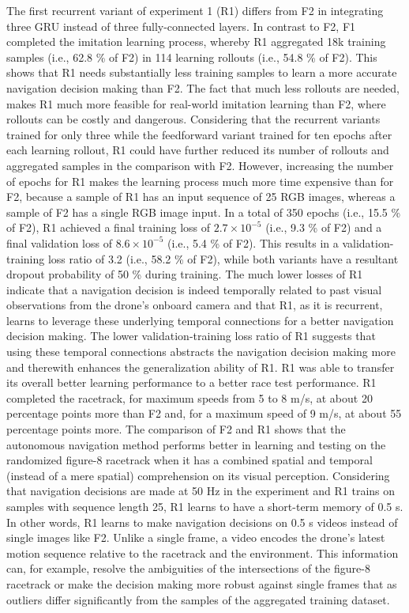 The first recurrent variant of experiment 1 (R1)
differs from F2 in integrating three GRU
instead of three fully-connected layers.
In contrast to F2,
F1 completed the imitation learning process,
whereby R1 aggregated 18k training samples (i.e., 62.8 \% of F2)
in 114 learning rollouts (i.e., 54.8 \% of F2).
This shows that R1 needs substantially less training samples
to learn a more accurate navigation decision making than F2.
The fact that much less rollouts are needed,
makes R1 much more feasible for real-world imitation learning than F2,
where rollouts can be costly and dangerous.
Considering that the recurrent variants trained for only three
while the feedforward variant trained for ten epochs after each learning rollout,
R1 could have further reduced its number of rollouts and aggregated samples
in the comparison with F2.
However, increasing the number of epochs for R1 makes the 
learning process much more time expensive than for F2,
because a sample of R1 
has an input sequence of 25 RGB images,
whereas a sample of F2 has a single RGB image input.
In a total of 350 epochs (i.e., 15.5 \% of F2),
R1 achieved a final training loss of $2.7\times 10^{-5}$ 
(i.e., 9.3 \% of F2)
and a final validation loss of
$8.6\times 10^{-5}$
(i.e., 5.4 \% of F2).
This results in a validation-training loss ratio
of 3.2 (i.e., 58.2 \% of F2),
while both variants have a resultant dropout probability of 50 \% during training.
The much lower losses of R1 indicate
that a navigation decision is indeed temporally related
to past visual observations from the drone's onboard camera
and that R1, as it is recurrent, 
learns to leverage these underlying temporal connections
for a better navigation decision making.
The lower validation-training loss ratio of R1 
suggests that using these temporal connections
abstracts the navigation decision making more and therewith
enhances the generalization ability of R1.
R1 was able to transfer its overall better learning performance to a better race test performance.
R1 completed the racetrack, for maximum speeds from 5 to 8 m/s, at about 20 percentage points more than F2
and, for a maximum speed of 9 m/s, at about 55 percentage points more.
The comparison of F2 and R1
shows that the autonomous navigation method
performs better in learning and testing
on the randomized figure-8 racetrack
when it has a combined spatial and temporal 
(instead of a mere spatial) comprehension on its visual perception.
Considering that navigation decisions are made at 50 Hz in the experiment
and R1 trains on samples with sequence length 25,
R1 learns to have a short-term memory of 0.5 s.
In other words, R1 learns to make navigation decisions on 0.5 s videos instead of single images like F2.
Unlike a single frame, a video encodes the drone's latest motion sequence 
relative to the racetrack and the environment.
This information can, for example, resolve the ambiguities of the intersections of the figure-8 racetrack
or make the decision making more robust against single frames that as outliers 
differ significantly from the samples of the aggregated training dataset.


